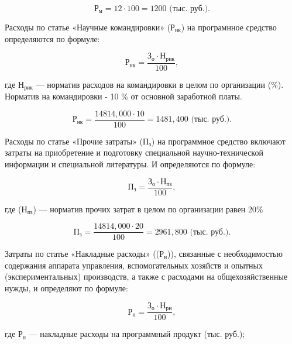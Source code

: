 \begin{equation}
  \text{Р}_{\text{м}} = 12 \cdot 100 = 1200 \text{ (тыс. руб.)}.
\end{equation}

Расходы по статье «Научные командировки» (\(\text{Р}_{\text{нк}}\)) на програмнное средство определяются по формуле:

\begin{equation}
  \text{Р}_{\text{нк}} = \frac{\text{З}_{\text{о}} \cdot \text{Н}_{\text{рик}}}{100},
\end{equation}

где \(\text{Н}_{\text{рик}}\) --- норматив расходов на командировки в целом по организации (\%). Норматив на командировки - 10 \% от основной заработной платы.

\begin{equation}
  \text{Р}_{\text{нк}} = \frac{14814,000 \cdot 10}{100} = 1481,400 \text{ (тыс. руб.)}.
\end{equation}

Расходы по статье «Прочие затраты» (\(\text{П}_{\text{з}}\)) на программное средство включают затраты на приобретение и подготовку специальной научно-технической информации и специальной литературы. И определяются по формуле:

\begin{equation}
  \text{П}_{\text{з}} = \frac{\text{З}_{\text{о}} \cdot \text{Н}_{\text{пз}}}{100},
\end{equation}

где (\(\text{Н}_{\text{пз}}\)) --- норматив прочих затрат в целом по организации равен 20\%

\begin{equation}
  \text{П}_{\text{з}} = \frac{14814,000 \cdot 20}{100} = 2961,800 \text{ (тыс. руб.)}.
\end{equation}

Затраты по статье «Накладные расходы» ((\(\text{Р}_{\text{н}}\))), связанные с необходимостью содержания аппарата управления, вспомогательных хозяйств и опытных (экспериментальных) производств, а также с расходами на общехозяйственные нужды, и определяют по формуле:

\begin{equation}
  \text{Р}_{\text{н}} = \frac{\text{З}_{\text{о}} \cdot \text{Н}_{\text{рн}}}{100},
\end{equation}

где \(\text{Р}_{\text{н}}\) --- накладные расходы на программный продукт (тыс. руб.);

